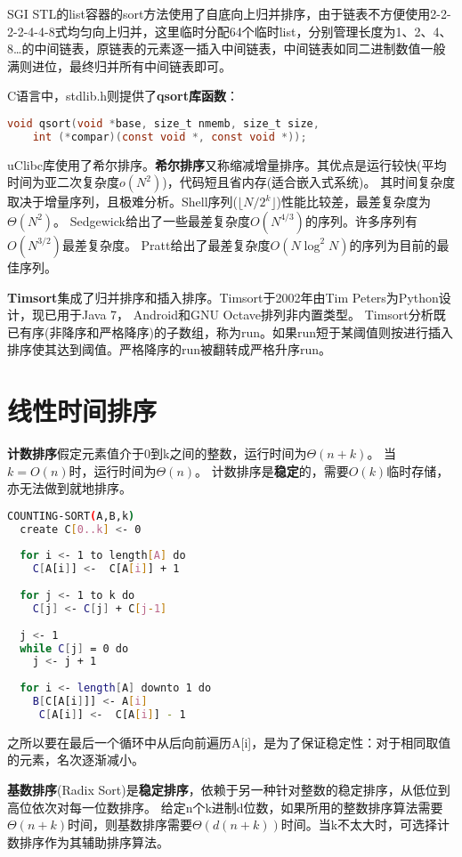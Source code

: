 SGI STL的list容器的sort方法使用了自底向上归并排序，由于链表不方便使用2-2-2-2-4-4-8式均匀向上归并，这里临时分配64个临时list，分别管理长度为1、2、4、8\dots 的中间链表，原链表的元素逐一插入中间链表，中间链表如同二进制数值一般满则进位，最终归并所有中间链表即可。

C语言中，stdlib.h则提供了\textbf{qsort库函数}：
\begin{lstlisting}[language=C]
void qsort(void *base, size_t nmemb, size_t size,
    int (*compar)(const void *, const void *));
\end{lstlisting}

uClibc库使用了希尔排序。\textbf{希尔排序}又称缩减增量排序。其优点是运行较快(平均时间为亚二次复杂度$o(N^2)$)，代码短且省内存(适合嵌入式系统)。
其时间复杂度取决于增量序列，且极难分析。Shell序列($\lfloor N/2^{k}\rfloor $)性能比较差，最差复杂度为$\Theta(N^2)$。
Sedgewick给出了一些最差复杂度$O(N^{4/3})$的序列。许多序列有$O(N^{3/2})$最差复杂度。
Pratt给出了最差复杂度$O(N \log^{2} N)$的序列为目前的最佳序列。

\textbf{Timsort}集成了归并排序和插入排序。Timsort于2002年由Tim Peters为Python设计，现已用于Java 7， Android和GNU Octave排列非内置类型。
Timsort分析既已有序(非降序和严格降序)的子数组，称为run。如果run短于某阈值则按进行插入排序使其达到阈值。严格降序的run被翻转成严格升序run。



\section{线性时间排序}
\textbf{计数排序}假定元素值介于0到k之间的整数，运行时间为$\Theta(n+k)$。
当$k=O(n)$时，运行时间为$\Theta(n)$。
计数排序是\textbf{稳定}的，需要$O(k)$临时存储，亦无法做到就地排序。
\begin{lstlisting}[language=bash]
COUNTING-SORT(A,B,k)
  create C[0..k] <- 0
  
  for i <- 1 to length[A] do
    C[A[i]] <-  C[A[i]] + 1
    
  for j <- 1 to k do
    C[j] <- C[j] + C[j-1]
    
  j <- 1
  while C[j] = 0 do
    j <- j + 1
    
  for i <- length[A] downto 1 do
    B[C[A[i]]] <- A[i]
     C[A[i]] <-  C[A[i]] - 1
\end{lstlisting}
之所以要在最后一个循环中从后向前遍历A[i]，是为了保证稳定性：对于相同取值的元素，名次逐渐减小。

\textbf{基数排序}(Radix Sort)是\textbf{稳定排序}，依赖于另一种针对整数的稳定排序，从低位到高位依次对每一位数排序。
给定n个k进制d位数，如果所用的整数排序算法需要$\Theta(n+k)$时间，则基数排序需要$\Theta(d(n+k))$时间。当k不太大时，可选择计数排序作为其辅助排序算法。

